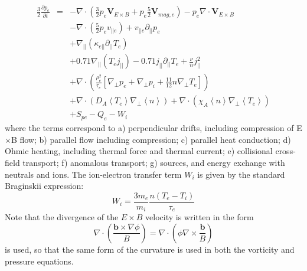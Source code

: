 \documentclass[12pt,a4paper]{article}
\newcommand{\deriv}[2]{\frac{\partial #1}{\partial #2}}
\begin{document}
\begin{subequations}
\begin{eqnarray}
  \frac{3}{2}\deriv{p_e}{t} &=& -\nabla\cdot\left(\frac{3}{2}p_e\mathbf{V}_{E\times B} + p_e\frac{5}{2}\mathbf{V}_{mag,e}\right) - p_e\nabla\cdot\mathbf{V}_{E\times B}\\
  &&  - \nabla\cdot\left(\frac{5}{2}p_e v_{||e}\right)+ v_{||e}\partial_{||}p_e \\
  && + \nabla_{||}\left(\kappa_{e||}\partial_{||}T_e\right)  \\
  && + 0.71\nabla_{||}\left(T_e j_{||}\right) - 0.71 j_{||}\partial_{||} T_e + \frac{\nu}{n}j_{||}^2 \\
  && + \nabla\cdot\left(\frac{\rho_e^2}{\tau_e}\left[\nabla_\perp p_e + \nabla_\perp p_i + \frac{11}{12}n\nabla_\perp T_e\right]\right) \\
  && + \nabla\cdot \left(D_A\left<T_e\right>\nabla_\perp \left<n\right>\right) + \nabla\cdot\left(\chi_A \left<n\right>\nabla_\perp \left<T_e\right>\right) \\
  && + S_{pe} - Q_e - W_i
\end{eqnarray}
\end{subequations}
where the terms correspond to a) perpendicular drifts, including compression of E$\times$B flow; b) parallel flow including compression; c) parallel heat conduction; d) Ohmic heating, including thermal force and thermal current; e) collisional cross-field transport; f) anomalous transport; g) sources, and energy exchange with neutrals and ions.
The ion-electron transfer term $W_i$ is given by the standard Braginskii expression:
\begin{equation}
  W_i = \frac{3m_e}{m_i}\frac{n\left(T_e - T_i\right)}{\tau_e}
\end{equation}
Note that the divergence of the $E\times B$ velocity is written in the form
\[
\nabla\cdot\left(\frac{\mathbf{b}\times\nabla\phi}{B}\right) = \nabla\cdot\left( \phi \nabla\times\frac{\mathbf{b}}{B}\right)
\]
is used, so that the same form of the curvature is used in both the vorticity and pressure equations.
\end{document}
